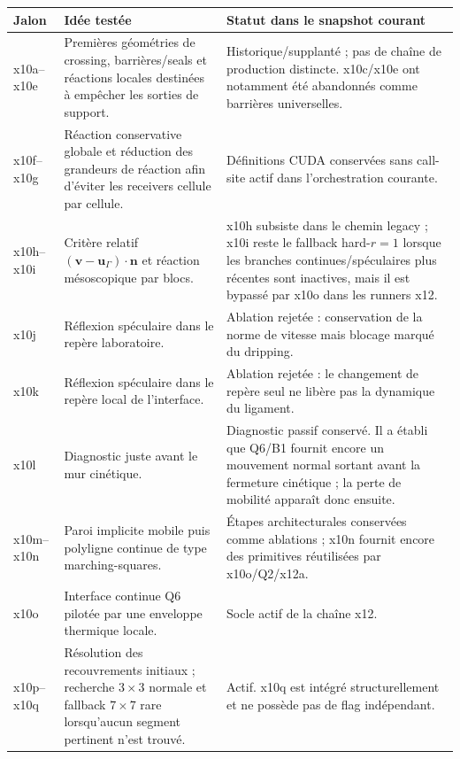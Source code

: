 \documentclass[11pt,a4paper]{article}
\begin{document}
\begin{table}[htbp]
\centering
\small
\begin{tabular}{>{\raggedright\arraybackslash}p{2.0cm}
                >{\raggedright\arraybackslash}p{7.2cm}
                >{\raggedright\arraybackslash}p{5.0cm}}
\toprule
Jalon & Idée testée & Statut dans le snapshot courant \\
\midrule
x10a--x10e &
Premières géométries de crossing, barrières/seals et réactions locales destinées à empêcher les sorties de support. &
Historique/supplanté ; pas de chaîne de production distincte. x10c/x10e ont notamment été abandonnés comme barrières universelles. \\
x10f--x10g &
Réaction conservative globale et réduction des grandeurs de réaction afin d'éviter les receivers cellule par cellule. &
Définitions CUDA conservées sans call-site actif dans l'orchestration courante. \\
x10h--x10i &
Critère relatif $(\bm v-\bm u_\Gamma)\cdot\bm n$ et réaction mésoscopique par blocs. &
x10h subsiste dans le chemin legacy ; x10i reste le fallback hard-$r=1$ lorsque les branches continues/spéculaires plus récentes sont inactives, mais il est bypassé par x10o dans les runners x12. \\
x10j &
Réflexion spéculaire dans le repère laboratoire. &
Ablation rejetée : conservation de la norme de vitesse mais blocage marqué du dripping. \\
x10k &
Réflexion spéculaire dans le repère local de l'interface. &
Ablation rejetée : le changement de repère seul ne libère pas la dynamique du ligament. \\
x10l &
Diagnostic juste avant le mur cinétique. &
Diagnostic passif conservé. Il a établi que Q6/B1 fournit encore un mouvement normal sortant avant la fermeture cinétique ; la perte de mobilité apparaît donc ensuite. \\
x10m--x10n &
Paroi implicite mobile puis polyligne continue de type marching-squares. &
Étapes architecturales conservées comme ablations ; x10n fournit encore des primitives réutilisées par x10o/Q2/x12a. \\
x10o &
Interface continue Q6 pilotée par une enveloppe thermique locale. &
Socle actif de la chaîne x12. \\
x10p--x10q &
Résolution des recouvrements initiaux ; recherche $3\times3$ normale et fallback $7\times7$ rare lorsqu'aucun segment pertinent n'est trouvé. &
Actif. x10q est intégré structurellement et ne possède pas de flag indépendant. \\

\end{tabular}
\end{table}
\end{document}

